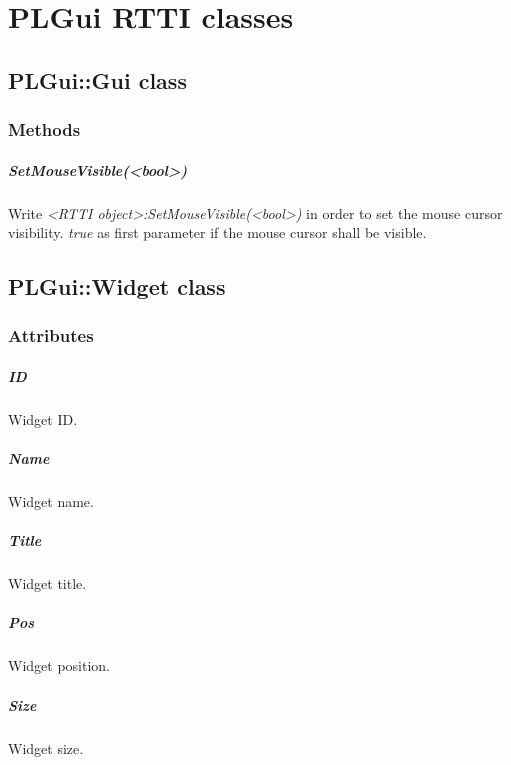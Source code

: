 \chapter{PLGui RTTI classes}




\section{PLGui::Gui class}


\subsection{Methods}

\paragraph{SetMouseVisible(<bool>)}
Write \emph{<RTTI object>:SetMouseVisible(<bool>)} in order to set the mouse cursor visibility. \emph{true} as first parameter if the mouse cursor shall be visible.




\section{PLGui::Widget class}


\subsection{Attributes}

\paragraph{ID}
Widget ID.

\paragraph{Name}
Widget name.

\paragraph{Title}
Widget title.

\paragraph{Pos}
Widget position.

\paragraph{Size}
Widget size.

